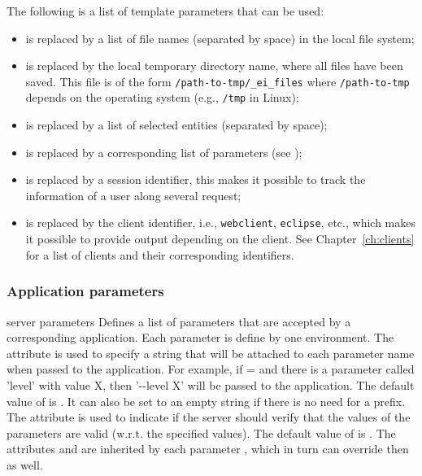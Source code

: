 {  \bigskip 
  \noindent
  The following is a list of template parameters that can be used:

  \begin{itemize}
  \item {} is replaced by a list of file
    names (separated by space) in the local file system;

  \item {} is replaced by the local
    temporary directory name, where all files have been saved. This
    file is of the form \texttt{/path-to-tmp/\_ei\_files} where
    \texttt{/path-to-tmp} depends on the operating system (e.g.,
    \texttt{/tmp} in Linux);
  \item {} is replaced by a list of
    selected entities (separated by space);
  \item {} is replaced by a
    corresponding list of parameters (see );
  \item {} is replaced by a session
    identifier, this makes it possible to track the information of a
    user along several request;
  \item {} is replaced by the client
    identifier, i.e., \texttt{webclient}, \texttt{eclipse}, etc.,
    which makes it possible to provide output depending on the
    client. See Chapter~\ref{ch:clients} for a list of clients and
    their corresponding identifiers.
  \end{itemize}
%
}


\subsubsection{Application parameters}

\bigskip 
\xmlstruct
{server}
{parameters} 
{%
%
  Defines a list of parameters that are accepted by a corresponding
  application. Each parameter is define by one 
  environment. 
  The  attribute is used to specify a string
  that will be attached to each parameter name when passed to the
  application.
  For example, if = and
  there is a parameter called 'level' with value X, then '{-}{-}level
  X' will be passed to the application.  The default value of
   is . It can also be set
  to an empty string if there is no need for a prefix.
  The  attribute is used to indicate if the
  server should verify that the values of the parameters are valid
  (w.r.t. the specified values). The default value of
   is .
  The attributes  and  are
  inherited by each parameter , which in turn can
  override then as well.
%
}
{}%

